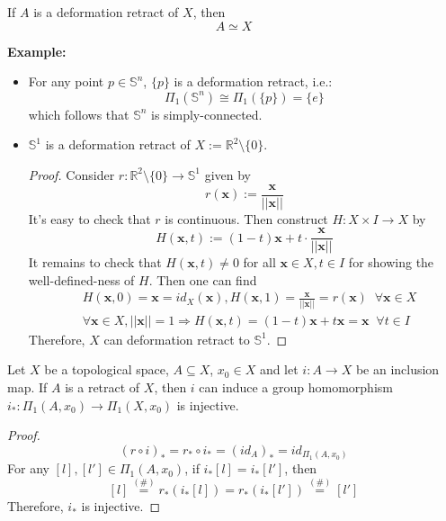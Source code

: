\begin{proposition}
    If $A$ is a deformation retract of $X$, then
    $$A \simeq X$$
\end{proposition}

\noindent\textbf{Example:} 
\begin{itemize}
    \item For any point $p \in \mathbb{S}^n$, $\{p\}$ is a deformation retract, i.e.:
    $$\Pi_1(\mathbb{S}^n) \cong \Pi_1(\{p\}) =\{e\}$$
    which follows that $\mathbb{S}^n$ is simply-connected.
    \item $\mathbb{S}^1$ is a deformation retract of $X:= \mathbb{R}^2 \setminus \{0\}$.
    \begin{proof}
        Consider $r: \mathbb{R}^2 \setminus \{0\} \to \mathbb{S}^1$ given by
        $$r(\mathbf{x}) := \frac{\mathbf{x}}{||\mathbf{x}||}$$
        It's easy to check that $r$ is continuous. Then construct $H: X \times I \to X$ by
        $$H(\mathbf{x},t) := (1-t) \mathbf{x} + t \cdot \frac{\mathbf{x}}{|| \mathbf{x}||}$$
        It remains to check that $H(\mathbf{x},t) \neq 0$ for all $\mathbf{x} \in X,t\in I$ for showing the well-defined-ness of $H$. Then one can find
        \begin{align*}
            &H(\mathbf{x},0) = \mathbf{x} =id_X(\mathbf{x}),H(\mathbf{x},1) = \frac{\mathbf{x}}{|| \mathbf{x}||} = r(\mathbf{x}) \;\;\forall \mathbf{x} \in X\\
            &\forall \mathbf{x} \in X, ||\mathbf{x}|| =1 \Rightarrow H(\mathbf{x},t) = (1-t) \mathbf{x} + t\mathbf{x} = \mathbf{x} \;\;\forall t \in I
        \end{align*}
        Therefore, $X$ can deformation retract to $\mathbb{S}^1$.
    \end{proof}
\end{itemize}

\begin{proposition}
    Let $X$ be a topological space, $A \subseteq X$, $x_0 \in X$ and let $i: A \rightarrow X$ be an inclusion map. If $A$ is a retract of $X$, then $i$ can induce a group homomorphism $i_* : \Pi_1 (A,x_0) \to \Pi_1 (X,x_0)$ is injective.
\end{proposition}

\begin{proof}
    \begin{equation*}
        (r \circ i)_* = r_* \circ i_* = (id_A)_* = id_{\Pi_1 (A,x_0)} \tag{\#}
    \end{equation*}
    For any $[l],[l'] \in \Pi_1 (A,x_0)$, if $i_*[l] = i_*[l']$, then
    $$[l] \overset{(\#)}{=} r_*(i_*[l]) = r_*(i_*[l']) \overset{(\#)}{=} [l']$$
    Therefore, $i_*$ is injective.
\end{proof}

